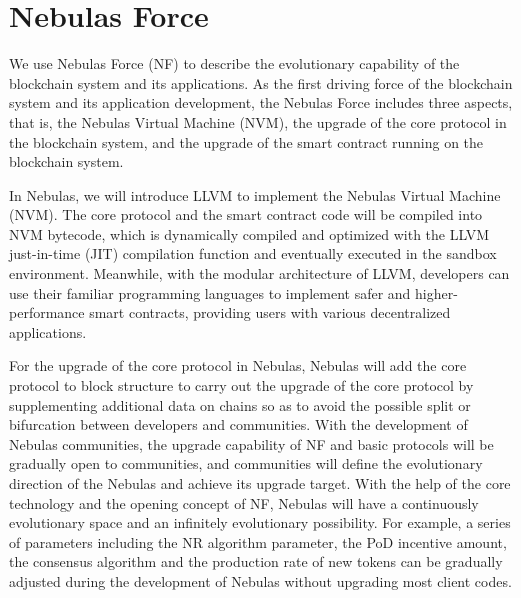 \section{Nebulas Force}
\label{sec:nebulasforce}

We use Nebulas Force (NF) to describe the evolutionary capability of the blockchain system and its applications. As the first driving force of the blockchain system and its application development, the Nebulas Force includes three aspects, that is, the Nebulas Virtual Machine (NVM), the upgrade of the core protocol in the blockchain system, and the upgrade of the smart contract running on the blockchain system.


In Nebulas, we will introduce LLVM to implement the Nebulas Virtual Machine (NVM). The core protocol and the smart contract code will be compiled into NVM bytecode, which is dynamically compiled and optimized with the LLVM just-in-time (JIT) compilation function and eventually executed in the sandbox environment. Meanwhile, with the modular architecture of LLVM, developers can use their familiar programming languages to implement safer and higher-performance smart contracts, providing users with various decentralized applications.


For the upgrade of the core protocol in Nebulas, Nebulas will add the core protocol to block structure to carry out the upgrade of the core protocol by supplementing additional data on chains so as to avoid the possible split or bifurcation between developers and communities. With the development of Nebulas communities, the upgrade capability of NF and basic protocols will be gradually open to communities, and communities will define the evolutionary direction of the Nebulas and achieve its upgrade target. With the help of the core technology and the opening concept of NF, Nebulas will have a continuously evolutionary space and an infinitely evolutionary possibility. For example, a series of parameters including the NR algorithm parameter, the PoD incentive amount, the consensus algorithm and the production rate of new tokens can be gradually adjusted during the development of Nebulas without upgrading most client codes.

